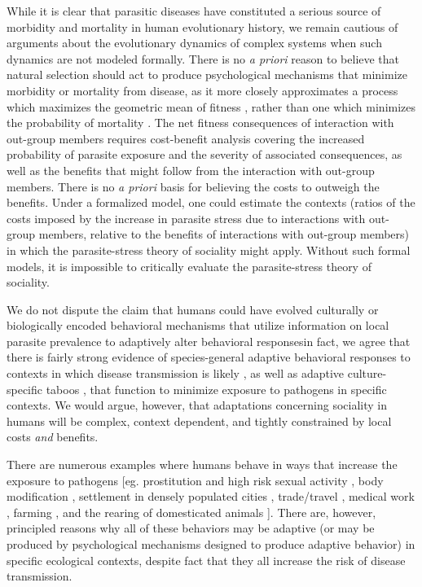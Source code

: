 \documentclass[12pt]{article}
\begin{document}
While it is clear that parasitic diseases have constituted a serious source of morbidity and mortality in human evolutionary history, we remain cautious of arguments about the evolutionary dynamics of complex systems when such dynamics are not modeled formally. There is no \textit{a priori} reason to believe that natural selection should act to produce psychological mechanisms that minimize morbidity or mortality from disease, as it more closely approximates a process which maximizes the geometric mean of fitness \citep{Gillespie1977,Boyce1987}, rather than one which minimizes the probability of mortality \citep[see][on senescence]{kirkwood1991evolution, williams2001pleiotropy}. The net fitness consequences of interaction with out-group members requires cost-benefit analysis covering the increased probability of parasite exposure and the severity of associated consequences, as well as the benefits that might follow from the interaction with out-group members.  There is no \textit{a priori} basis for believing the costs to outweigh the benefits.  Under a formalized model, one could estimate the contexts (ratios of the costs imposed by the increase in parasite stress due to interactions with out-group members, relative to the benefits of interactions with out-group members) in which the parasite-stress theory of sociality might apply. Without such formal models, it is impossible to critically evaluate the parasite-stress theory of sociality. 

	We do not dispute the claim that humans could have evolved culturally or biologically encoded behavioral mechanisms that utilize information on local parasite prevalence to adaptively alter behavioral responses\textemdash in fact, we agree that there is fairly strong evidence of species-general adaptive behavioral responses to contexts in which disease transmission is likely \citep{curtis2001dirt,curtis2011disgust}, as well as adaptive culture-specific taboos \citep[eg. prohibitions on eating pork,][]{diener1978ecology}, that function to minimize exposure to pathogens in specific contexts. We would argue, however, that adaptations concerning sociality in humans will be complex, context dependent, and tightly constrained by local costs \textit{and} benefits. 
	
	 There are numerous examples where humans behave in ways that increase the exposure to pathogens [eg. prostitution and high risk sexual activity \citep{Carcamo2012765}, body modification \citep{tweeten1998infectious}, settlement in densely populated cities \citep{de1995does}, trade/travel \citep{ali2006global}, medical work \citep{pearson1992nosocomial}, farming \citep{matthys2006urban}, and the rearing of domesticated animals \citep{vaughn1992epidemiology}].  There are, however, principled reasons why all of these behaviors may be adaptive (or may be produced by psychological mechanisms designed to produce adaptive behavior) in specific ecological contexts, despite fact that they all increase the risk of disease transmission. 
	 
\end{document}
